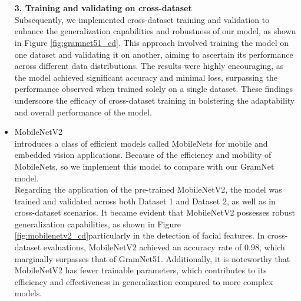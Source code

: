 \documentclass[rebuttal]{cvpr}
\begin{document}
\begin{itemize}
            \\
            \\
        \textbf{3. Training and validating on cross-dataset} \\
            Subsequently, we implemented cross-dataset training and validation to enhance the generalization capabilities and robustness of our model, as shown in Figure \ref{fig:gramnet51_cd}. This approach involved training the model on one dataset and validating it on another, aiming to ascertain its performance across different data distributions. The results were highly encouraging, as the model achieved significant accuracy and minimal loss, surpassing the performance observed when trained solely on a single dataset. These findings underscore the efficacy of cross-dataset training in bolstering the adaptability and overall performance of the model.
        \item MobileNetV2 \\
        \cite{howard2017mobilenets} introduces a class of efficient models called MobileNets for mobile and embedded vision applications. Because of the efficiency and mobility of MobileNets, so we implement this model to compare with our GramNet model. \\
        
        Regarding the application of the pre-trained MobileNetV2, the model was trained and validated across both Dataset 1 and Dataset 2, as well as in cross-dataset scenarios. It became evident that MobileNetV2 possesses robust generalization capabilities, as shown in Figure \ref{fig:mobilenetv2_cd}particularly in the detection of facial features. In cross-dataset evaluations, MobileNetV2 achieved an accuracy rate of 0.98, which marginally surpasses that of GramNet51. Additionally, it is noteworthy that MobileNetV2 has fewer trainable parameters, which contributes to its efficiency and effectiveness in generalization compared to more complex models.
\end{itemize}
\end{document}
